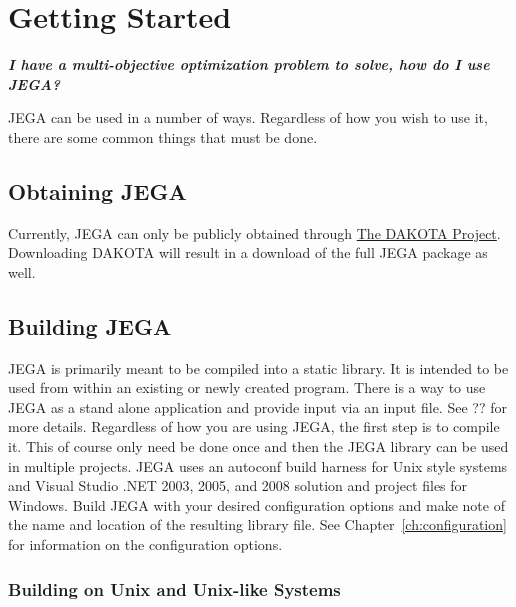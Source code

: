 \chapter{Getting Started} \label{ch:getting_started}

\vspace{1em}
\begin{center}
\parbox{5.5in}{ \emph{
\textbf{I have a multi-objective optimization problem to solve, how
do I use JEGA?}} }
\end{center}
\vspace{1em}

JEGA can be used in a number of ways.  Regardless of how you wish to
use it, there are some common things that must be done.

\section{Obtaining JEGA} \label{sec:obtaining_JEGA}

Currently, JEGA can only be publicly obtained through
\href{http://dakota.sandia.gov}{The DAKOTA Project}.  Downloading
DAKOTA will result in a download of the full JEGA package as well.

\section{Building JEGA}\label{sec:building_JEGA}

JEGA is primarily meant to be compiled into a static library.  It is
intended to be used from within an existing or newly created
program.  There is a way to use JEGA as a stand alone application
and provide input via an input file.  See ?? for more details.
Regardless of how you are using JEGA, the first step is to compile
it. This of course only need be done once and then the JEGA library
can be used in multiple projects. JEGA uses an autoconf build
harness for Unix style systems and Visual Studio .NET 2003, 2005, and
2008 solution and project files for Windows. Build JEGA with your desired
configuration options and make note of the name and location of the
resulting library file.  See Chapter~\ref{ch:configuration} for
information on the configuration options.

\subsection{Building on Unix and Unix-like Systems}\label{sec:building_unix}

